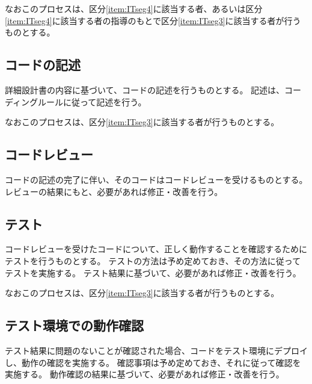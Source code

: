 なおこのプロセスは、区分\ref{item:ITseg4}\hx に該当する者、あるいは区分\ref{item:ITseg4}\hx に該当する者の指導のもとで区分\ref{item:ITseg3}\hx に該当する者が行うものとする。

\subsection{コードの記述}
詳細設計書の内容に基づいて、コードの記述を行うものとする。
記述は、コーディングルールに従って記述を行う。

なおこのプロセスは、区分\ref{item:ITseg3}\hx に該当する者が行うものとする。

\subsection{コードレビュー}
コードの記述の完了に伴い、そのコードはコードレビューを受けるものとする。
レビューの結果にもと、必要があれば修正・改善を行う。

\subsection{テスト}
コードレビューを受けたコードについて、正しく動作することを確認するためにテストを行うものとする。
テストの方法は予め定めておき、その方法に従ってテストを実施する。
テスト結果に基づいて、必要があれば修正・改善を行う。

なおこのプロセスは、区分\ref{item:ITseg3}\hx に該当する者が行うものとする。

\clearpage
\subsection{テスト環境での動作確認}
テスト結果に問題のないことが確認された場合、コードをテスト環境にデプロイし、動作の確認を実施する。
確認事項は予め定めておき、それに従って確認を実施する。
動作確認の結果に基づいて、必要があれば修正・改善を行う。

